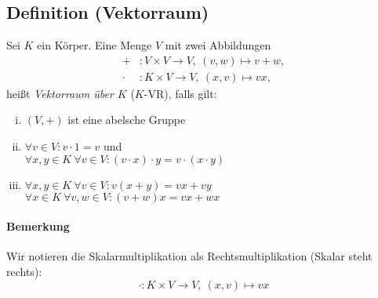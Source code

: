 
\subsection{Definition (Vektorraum)}
	\begin{Definition}[Vektorraum]
		Sei $K$ ein Körper. Eine Menge $V$ mit zwei Abbildungen
	\begin{align*}
		 +&: V \times V \to V,\ (v,w)\mapsto v+w,\\
		 \cdot &: K \times V \to V,\ (x,v)\mapsto vx,
	\end{align*}
	heißt \emph{Vektorraum über $K$} ($K$-VR), falls gilt:
	\begin{enumerate}[(i)]
		\item $(V,+)$ ist eine abelsche Gruppe
		\item $\forall v\in V: v\cdot 1=v$ und\\
                      $\forall x,y \in K\ \forall v\in V: (v\cdot x)\cdot y = v\cdot (x\cdot y)$
		\item $\forall x,y \in K\ \forall v\in V: v(x+y) = vx + vy$\\
                      $\forall x\in K\ \forall v,w\in V: (v+w)x = vx + wx$
	\end{enumerate}
	\end{Definition}

\paragraph{Bemerkung}
	Wir notieren die Skalarmultiplikation als Rechtsmultiplikation (Skalar steht rechts):
		\[ \cdot: K \times V \to V,\ (x,v) \mapsto vx \]

